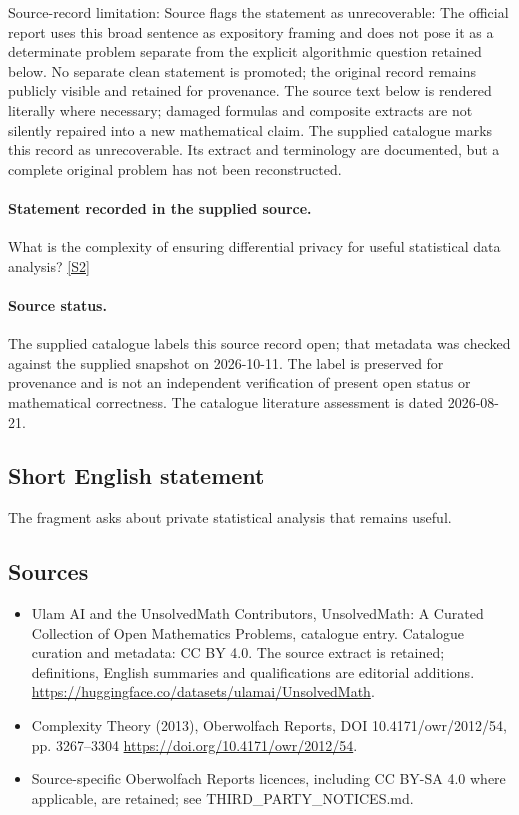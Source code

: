 \documentclass[11pt]{article}
\begin{document}
Source-record limitation: Source flags the statement as unrecoverable: The official report uses this broad sentence as expository framing and does not pose it as a determinate problem separate from the explicit algorithmic question retained below. No separate clean statement is promoted; the original record remains publicly visible and retained for provenance.
The source text below is rendered literally where necessary; damaged formulas and composite extracts are not silently repaired into a new mathematical claim.
The supplied catalogue marks this record as unrecoverable. Its extract and terminology are documented, but a complete original problem has not been reconstructed.
\paragraph{Statement recorded in the supplied source.}
What is the complexity of ensuring differential privacy for useful statistical data analysis? \href{https://doi.org/10.4171/owr/2012/54}{[S2]}
\paragraph{Source status.}
The supplied catalogue labels this source record open; that metadata was checked against the supplied snapshot on 2026-10-11. The label is preserved for provenance and is not an independent verification of present open status or mathematical correctness. The catalogue literature assessment is dated 2026-08-21.
\subsection{Short English statement}
The fragment asks about private statistical analysis that remains useful.
\subsection{Sources}
\begin{itemize}
\item[S1] Ulam AI and the UnsolvedMath Contributors, UnsolvedMath: A Curated Collection of Open Mathematics Problems, catalogue entry. Catalogue curation and metadata: CC BY 4.0. The source extract is retained; definitions, English summaries and qualifications are editorial additions.
\url{https://huggingface.co/datasets/ulamai/UnsolvedMath}.
\item[S2] Complexity Theory (2013), Oberwolfach Reports, DOI 10.4171/owr/2012/54, pp. 3267--3304
\url{https://doi.org/10.4171/owr/2012/54}.
\item Source-specific Oberwolfach Reports licences, including CC BY-SA 4.0 where applicable, are retained; see THIRD\_PARTY\_NOTICES.md.
\end{itemize}
\end{document}
